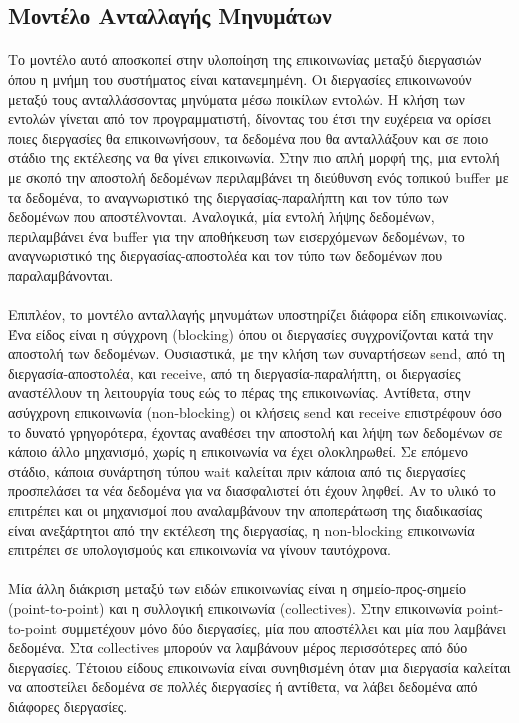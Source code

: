 \subsection{Μοντέλο Ανταλλαγής Μηνυμάτων}
\paragraph{}
Το μοντέλο αυτό αποσκοπεί στην υλοποίηση της επικοινωνίας μεταξύ διεργασιών όπου η μνήμη του συστήματος είναι κατανεμημένη. Οι διεργασίες επικοινωνούν μεταξύ τους ανταλλάσσοντας μηνύματα μέσω ποικίλων εντολών. Η κλήση των εντολών γίνεται από τον προγραμματιστή, δίνοντας του έτσι την ευχέρεια να ορίσει ποιες διεργασίες θα επικοινωνήσουν, τα δεδομένα που θα ανταλλάξουν και σε ποιο στάδιο της εκτέλεσης να θα γίνει επικοινωνία. Στην πιο απλή μορφή της, μια εντολή με σκοπό την αποστολή δεδομένων περιλαμβάνει τη διεύθυνση ενός τοπικού buffer με τα δεδομένα, το αναγνωριστικό της διεργασίας-παραλήπτη και τον τύπο των δεδομένων που αποστέλνονται. Αναλογικά, μία εντολή λήψης δεδομένων, περιλαμβάνει ένα buffer για την αποθήκευση των εισερχόμενων δεδομένων, το αναγνωριστικό της διεργασίας-αποστολέα και τον τύπο των δεδομένων που παραλαμβάνονται.


\paragraph{}
Επιπλέον, το μοντέλο ανταλλαγής μηνυμάτων υποστηρίζει διάφορα είδη επικοινωνίας. Ένα είδος είναι η σύγχρονη (blocking) όπου οι διεργασίες συγχρονίζονται κατά την αποστολή των δεδομένων. Ουσιαστικά, με την κλήση των συναρτήσεων send, από τη διεργασία-αποστολέα, και receive, από τη διεργασία-παραλήπτη,  οι διεργασίες αναστέλλουν τη λειτουργία τους εώς το πέρας της επικοινωνίας. Αντίθετα, στην ασύγχρονη επικοινωνία (non-blocking) οι κλήσεις send και receive επιστρέφουν όσο το δυνατό γρηγορότερα, έχοντας αναθέσει την αποστολή και λήψη των δεδομένων σε κάποιο άλλο μηχανισμό, χωρίς η επικοινωνία να έχει ολοκληρωθεί. Σε επόμενο στάδιο, κάποια συνάρτηση τύπου wait καλείται πριν κάποια από τις διεργασίες προσπελάσει τα νέα δεδομένα για να διασφαλιστεί ότι έχουν ληφθεί. Αν το υλικό το επιτρέπει και οι μηχανισμοί που αναλαμβάνουν την αποπεράτωση της διαδικασίας είναι ανεξάρτητοι από την εκτέλεση της διεργασίας, η non-blocking επικοινωνία επιτρέπει σε υπολογισμούς και επικοινωνία να γίνουν ταυτόχρονα. 

\paragraph{}
Μία άλλη διάκριση μεταξύ των ειδών επικοινωνίας είναι η σημείο-προς-σημείο (point-to-point) και η συλλογική επικοινωνία (collectives). Στην επικοινωνία point-to-point συμμετέχουν μόνο δύο διεργασίες, μία που αποστέλλει και μία που λαμβάνει δεδομένα. Στα collectives μπορούν να λαμβάνουν μέρος περισσότερες από δύο διεργασίες. Τέτοιου είδους επικοινωνία είναι συνηθισμένη όταν μια διεργασία καλείται να αποστείλει δεδομένα σε πολλές διεργασίες ή αντίθετα, να λάβει δεδομένα από διάφορες διεργασίες.

